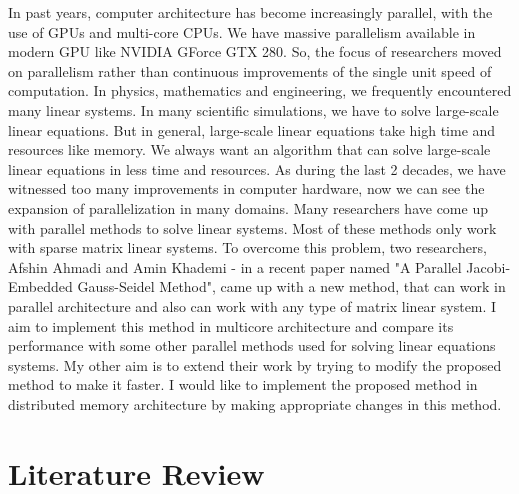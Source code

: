 \documentclass[11pt]{article}       %
\begin{document}
In past years, computer architecture has become increasingly parallel, with the use of GPUs and multi-core CPUs. We have massive parallelism available in modern GPU like NVIDIA GForce GTX 280.  So, the focus of researchers moved on parallelism rather than continuous improvements of the single unit speed of computation. In physics, mathematics and engineering, we frequently encountered many linear systems. In many scientific simulations, we have to solve large-scale linear equations. But in general, large-scale linear equations take high time and resources like memory. We always want an algorithm that can solve large-scale linear equations in less time and resources. As during the last 2 decades, we have witnessed too many improvements in computer hardware, now we can see the expansion of parallelization in many domains. Many researchers have come up with parallel methods to solve linear systems. Most of these methods only work with sparse matrix linear systems. To overcome this problem, two researchers, Afshin Ahmadi and Amin Khademi - in a recent paper named "A Parallel Jacobi-Embedded Gauss-Seidel Method", came up with a new method, that can work in parallel architecture and also can work with any type of matrix linear system. I aim to implement this method in multicore architecture and compare its performance with some other parallel methods used for solving linear equations systems. My other aim is to extend their work by trying to modify the proposed method to make it faster. I would like to implement the proposed method in distributed memory architecture by making appropriate changes in this method.


\section{Literature Review} \label{litrev}
\end{document}
